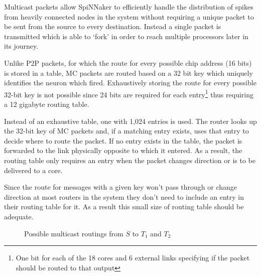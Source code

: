 				Multicast packets allow SpiNNaker to efficiently handle the distribution
				of spikes from heavily connected nodes in the system without requiring a
				unique packet to be sent from the source to every destination. Instead a
				single packet is transmitted which is able to `fork' in order to reach
				multiple processors later in its journey.
				
				Unlike P2P packets, for which the route for every possible chip address
				(16 bits) is stored in a table, MC packets are routed based on a 32 bit
				key which uniquely identifies the neuron which fired. Exhaustively
				storing the route for every possible 32-bit key is not possible since 24
				bits are required for each entry\footnote{One bit for each of the 18
				cores and 6 external links specifying if the packet should be routed to
				that output} thus requiring a 12 gigabyte routing table.
				
				Instead of an exhaustive table, one with 1,024 entries is used. The
				router looks up the 32-bit key of MC packets and, if a matching entry
				exists, uses that entry to decide where to route the packet. If no entry
				exists in the table, the packet is forwarded to the link physically
				opposite to which it entered. As a result, the routing table only
				requires an entry when the packet changes direction or is to be
				delivered to a core.
				
				Since the route for messages with a given key won't pass through or
				change direction at most routers in the system they don't need to
				include an entry in their routing table for it. As a result this small
				size of routing table should be adequate.
				
				\begin{figure}
					\begin{subfigure}[b]{0.24\textwidth}
						\center
						
						\caption{}
						\label{fig:multicast-routing-a}
					\end{subfigure}
					\begin{subfigure}[b]{0.24\textwidth}
						\center
						
						\caption{}
						\label{fig:multicast-routing-b}
					\end{subfigure}
					\begin{subfigure}[b]{0.24\textwidth}
						\center
						
						\caption{}
						\label{fig:multicast-routing-c}
					\end{subfigure}
					\begin{subfigure}[b]{0.24\textwidth}
						\center
						
						\caption{}
						\label{fig:multicast-routing-d}
					\end{subfigure}
					\caption{Possible multicast routings from $S$ to $T_1$ and $T_2$}
					\label{fig:multicast-routing}
				\end{figure}
				
